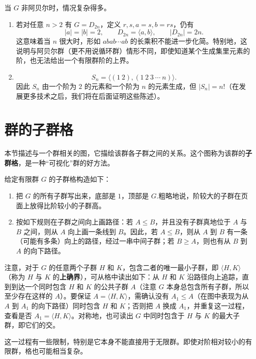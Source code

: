 当 $G$ 非阿贝尔时，情况复杂得多。
\begin{example}
	\begin{enumerate}
		\item 若对任意 $n>2$ 有 $G=D_{2n}$，定义 $r,s,a = s,b= rs$，仍有
		\[
		|a|=|b|=2,
		\qquad
		D_{2n}=\langle a,b\rangle,
		\qquad
		|D_{2n}|=2n.
		\]
		这意味着当 $n$ 很大时，形如 $abab\cdots ab$ 的长乘积不能进一步化简。特别地，这说明与阿贝尔群（更不用说循环群）情形不同，即使知道某个生成集里元素的阶，也无法给出一个有限群阶的上界。
		
		\item 
		\[
		S_n=\langle (1\ 2),(1\ 2\ 3\ \cdots\ n)\rangle.
		\]
		因此 $S_n$ 由一个阶为 $2$ 的元素和一个阶为 $n$ 的元素生成，但 $|S_n|=n!$（在发展更多技术之后，我们将在后面证明这些陈述）。
	\end{enumerate}
\end{example}

\section{群的子群格}

本节描述与一个群相关的图，它描绘该群各子群之间的关系。这个图称为该群的\textbf{子群格}，是一种“可视化”群的好方法。

给定有限群 $G$ 的子群格构造如下：
\begin{enumerate}
	\item 把 $G$ 的所有子群写出来，底部是 $1$，顶部是 $G$.粗略地说，阶较大的子群在页面上放得比阶较小的子群高。
	\item 按如下规则在子群之间向上画路径：若 $A\leq B$，并且没有子群真地位于 $A$ 与 $B$ 之间，则从 $A$ 向上画一条线到 $B$。因此，若 $A\leq B$，则从 $A$ 到 $B$ 有一条（可能有多条）向上的路径，经过一串中间子群；若 $B\geq A$，则也有从 $B$ 到 $A$ 的向下路径。
\end{enumerate}


注意，对于 $G$ 的任意两个子群 $H$ 和 $K$，包含二者的唯一最小子群，即 $\langle H,K\rangle$（称为 $H$ 与 $K$ 的\textbf{上确界}），可从格中读出如下：从 $H$ 和 $K$ 沿路径向上追踪，直到到达一个同时包含 $H$ 和 $K$ 的公共子群 $A$（注意 $G$ 本身总包含所有子群，所以至少存在这样的 $A$）。要保证 $A=\langle H,K\rangle$，需确认没有 $A_1\leq A$（在图中表现为从 $A$ 到 $A_1$ 的向下路径）同时包含 $H$ 和 $K$；否则把 $A$ 换成 $A_1$，并重复这一过程，查看是否 $A_1=\langle H,K\rangle$。对称地，也可读出 $G$ 中同时包含于 $H$ 与 $K$ 的最大子群，即它们的交。

这一过程有一些限制，特别是它本身不能直接用于无限群。即使对阶相对较小的有限群，格也可能相当复杂。

